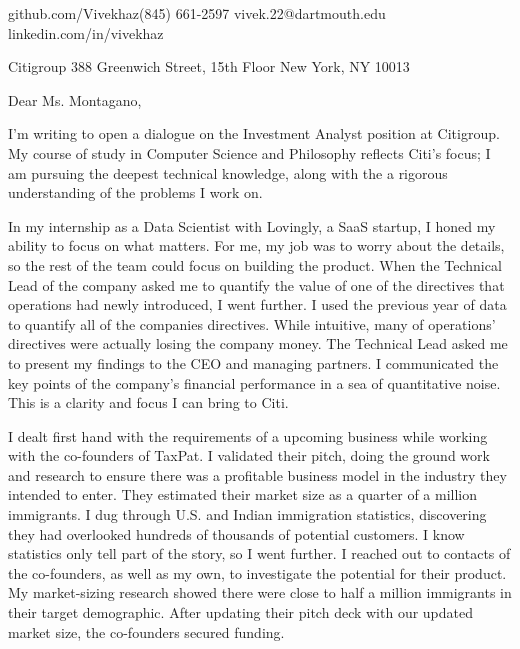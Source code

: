 \documentclass{vivek-cover-letter}
\begin{document}
\namehead

\address{ vivek.fm}{github.com/Vivekhaz}{(845) 661-2597}{ vivek.22@dartmouth.edu }{linkedin.com/in/vivekhaz}{}

%
%
\hfill

\begin{changemargin}{.7in}{.7in} 
\employerdate{\today}

\begin{changemargin}{.3in}{.3in} 
{Citigroup}
{388 Greenwich Street, 15th Floor}
{New York, NY 10013}
\end{changemargin}






Dear Ms. Montagano,

I'm writing to open a dialogue on the Investment Analyst position at Citigroup. My course of study in Computer Science and Philosophy reflects Citi's focus; I am pursuing the deepest technical knowledge, along with the a rigorous understanding of the problems I work on.

In my internship as a Data Scientist with Lovingly, a SaaS startup, I honed my ability to focus on what matters. For me, my job was to worry about the details, so the rest of the team could focus on building the product. When the Technical Lead of the company asked me to quantify the value of one of the directives that operations had newly introduced, I went further. I used the previous year of data to quantify all of the companies directives. While intuitive, many of operations' directives were actually losing the company money. The Technical Lead asked me to present my findings to the CEO and managing partners. I communicated the key points of the company's financial performance in a sea of quantitative noise. This is a clarity and focus I can bring to Citi.

I dealt first hand with the requirements of a upcoming business while working with the co-founders of TaxPat. I validated their pitch, doing the ground work and research to ensure there was a profitable business model in the industry they intended to enter. They estimated their market size as a quarter of a million immigrants. I dug through U.S. and Indian immigration statistics, discovering they had overlooked hundreds of thousands of potential customers. I know statistics only tell part of the story, so I went further. I reached out to contacts of the co-founders, as well as my own, to investigate the potential for their product. My market-sizing research showed there were close to half a million immigrants in their target demographic. After updating their pitch deck with our updated market size, the co-founders secured funding.


\end{changemargin}
\end{document}
